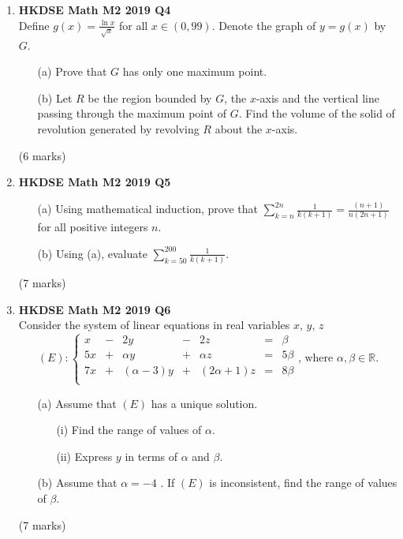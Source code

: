 \documentclass[12pt]{article}
\begin{document}
\begin{enumerate}
	\item \textbf{HKDSE Math M2 2019 Q4}\\
	Define $\displaystyle g(x) = \frac{\ln{x}}{\sqrt{x}}$ for all $x \in (0,99)$. Denote the graph of $y = g(x) $ by $G$. 
	\begin{enumerate}
		\item [(a)]Prove that $G$ has only one maximum point. 
		\item [(b)]Let $R$ be the region bounded by $G$, the $x$-axis and the vertical line passing through the maximum point of $G$. Find the volume of the solid of revolution generated by revolving $R$ about the $x$-axis.
	\end{enumerate}
	(6 marks)

	\item\textbf{HKDSE Math M2 2019 Q5}
	\begin{enumerate}
		\item [(a)] Using mathematical induction, prove that $\displaystyle \sum_{k = n}^{2n} \frac{1}{k(k+1)} = \frac{(n+1)}{n(2n+1)}$ for all positive integers $n$.
		\item [(b)] Using (a), evaluate $\displaystyle \sum_{k = 50}^{200} \frac{1}{k(k+1)}$.
	\end{enumerate}
	(7 marks)


	\item \textbf{HKDSE Math M2 2019 Q6}\\
	Consider the system of linear equations in real variables $x$, $y$, $z$
		$$(E):\left\{\begin{matrix}
		 x&  -&2y&  -&2z& = &\beta  \\
		5x&  +&\alpha y&  +&\alpha z& = & 5\beta \\
		7x&  +&(\alpha - 3)y&  +&(2\alpha+1)z& = & 8\beta \\
		\end{matrix}\right.\text{, where }\alpha, \beta \in \mathbb{R}.$$
		\begin{enumerate}
			\item [(a)]Assume that $(E)$ has a unique solution.
			\begin{enumerate}
				\item [(i)]Find the range of values of $\alpha$. 
				\item [(ii)]Express $y$ in terms of $\alpha$ and $\beta$. 
			\end{enumerate}
			\item [(b)]Assume that $\alpha = -4$ . If  $(E)$ is inconsistent, find the range of values of $\beta$.
		\end{enumerate}
	(7 marks)


\end{enumerate}
\end{document}

